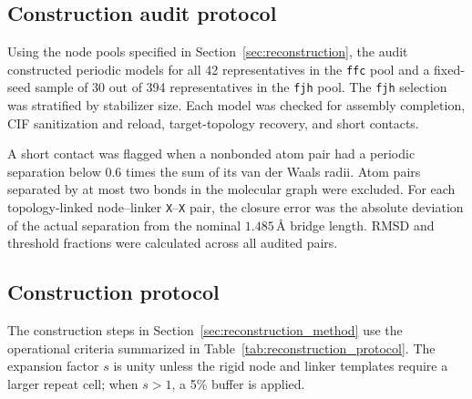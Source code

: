 \documentclass[a5paper, 10pt]{article}
\begin{document}
\subsection{Construction audit protocol}
\label{app:reconstruction_audit}

Using the node pools specified in Section~\ref{sec:reconstruction}, the audit constructed periodic models for all 42 representatives in the \texttt{ffc} pool and a fixed-seed sample of 30 out of 394 representatives in the \texttt{fjh} pool. The \texttt{fjh} selection was stratified by stabilizer size. Each model was checked for assembly completion, CIF sanitization and reload, target-topology recovery, and short contacts.

A short contact was flagged when a nonbonded atom pair had a periodic separation below $0.6$ times the sum of its van der Waals radii. Atom pairs separated by at most two bonds in the molecular graph were excluded. For each topology-linked node--linker \texttt{X}--\texttt{X} pair, the closure error was the absolute deviation of the actual separation from the nominal $1.485$\,\AA{} bridge length. RMSD and threshold fractions were calculated across all audited pairs.

\subsection{Construction protocol}
\label{app:reconstruction_protocol}

The construction steps in Section~\ref{sec:reconstruction_method} use the operational criteria summarized in Table~\ref{tab:reconstruction_protocol}. The expansion factor $s$ is unity unless the rigid node and linker templates require a larger repeat cell; when $s>1$, a 5\% buffer is applied.
\end{document}

